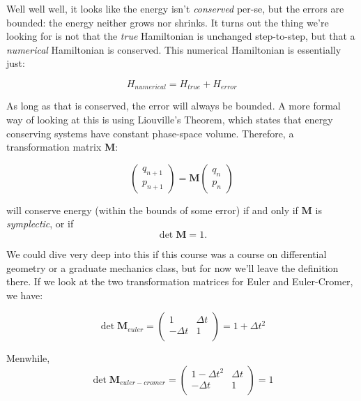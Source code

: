 \documentclass{article}
\theoremstyle{demo}
\begin{document}
Well well well, it looks like the energy isn't \textit{conserved} per-se, but
the errors are bounded: the energy neither grows nor shrinks.  It turns out the
thing we're looking for is not that the \textit{true} Hamiltonian is
unchanged step-to-step, but that a \textit{numerical} Hamiltonian is conserved.
This numerical Hamiltonian is essentially just:

\begin{equation}
    H_{numerical} = H_{true} + H_{error}
\end{equation}

As long as that is conserved, the error will always be bounded.  A more formal
way of looking at this is using Liouville's Theorem, which states that energy
conserving systems have constant phase-space volume.  Therefore, a
transformation matrix $\mathbf{M}$:

\begin{equation}
    \begin{pmatrix}
        q_{n+1} \\
        p_{n+1} 
    \end{pmatrix} = \mathbf{M}
    \begin{pmatrix}
        q_{n} \\
        p_{n} 
    \end{pmatrix} 
\end{equation}

will conserve energy (within the bounds of some error) if and only if
$\mathbf{M}$ is \textit{symplectic}, or if 
\begin{equation}
    \det\mathbf{M} = 1.  
\end{equation}

We could dive very deep into this if this course was a course on differential
geometry or a graduate mechanics class, but for now we'll leave the definition
there.  If we look at the two transformation matrices for Euler and
Euler-Cromer, we have:

\begin{equation}
    \det \mathbf{M}_{euler} = 
    \begin{pmatrix}
        1 & \Delta t \\
        -\Delta t & 1 \\
    \end{pmatrix} = 1 + \Delta t^2
\end{equation}

Menwhile,
\begin{equation}
    \det \mathbf{M}_{euler-cromer} = 
    \begin{pmatrix}
        1 - \Delta t^2 & \Delta t \\
        -\Delta t & 1 \\
    \end{pmatrix} = 1 
\end{equation}
\end{document}
